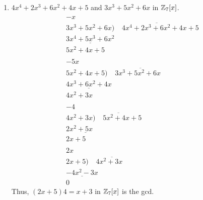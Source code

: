 \documentclass[../hw4]{subfiles}
\begin{document}
\begin{problem}
\begin{enumerate}[label=\roman*)]
	\item $4x^4 + 2x^3 + 6x^2 + 4x + 5$ and $3x^3 + 5x^2 + 6x$ in $\mathbb{Z}_7[x]$.
	      \[
		      \begin{array}{r}
			      -x \phantom{+00}                                                              \\
			      3x^3 + 5x^2 + 6x \big) \overline{\phantom{aa}  4x^4 + 2x^3 + 6x^2 + 4x + 5}   \\
			      \underline{3x^4 + 5x^3 + 6x^2}\phantom{ + 0x + 00}                            \\
			      5x^2 + 4x + 5                                                                 \\
			      \\
			      -5x\phantom{ + 00}                                                            \\
			      5x^2 + 4x + 5 \big) \overline{\phantom{aa}  3x^3 + 5x^2 + 6x \phantom{ + 00}} \\
			      \underline{4x^3 + 6x^2 + 4x}\phantom{ + 00}                                   \\
			      4x^2 + 3x\phantom{ + 00}                                                      \\
			      \\
			      -4                                                                            \\
			      4x^2 + 3x \big) \overline{\phantom{aa}  5x^2 + 4x + 5}                        \\
			      \underline{ 2x^2 + 5x\phantom{ + 00} }                                        \\
			      2x + 5                                                                        \\
			      \\
			      2x\phantom{ + 00}                                                             \\
			      2x + 5 \big) \overline{\phantom{aa}  4x^2 + 3x\phantom{ + 00}  }              \\
			      \underline{ -4x^2-3x }\phantom{ + 00}                                         \\
			      0
		      \end{array}
	      \]
	      Thus, $(2x+5)4=x+3$ in  $\mathbb{Z}_7[x]$ is the gcd.


\end{enumerate}
\end{problem}
\end{document}
